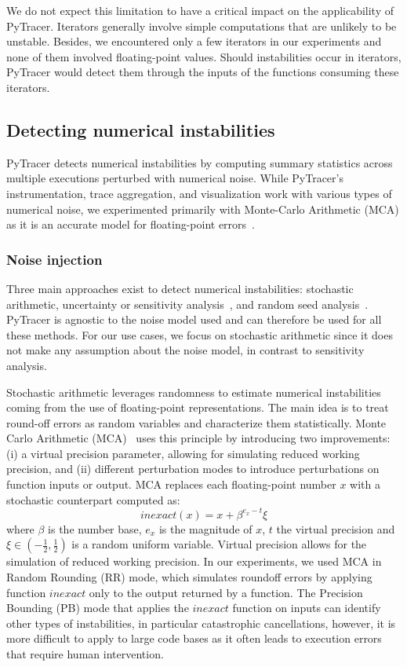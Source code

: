 \documentclass[10pt,journal,compsoc]{IEEEtran}
\newcommand{\pytracer}[0]{PyTracer\xspace}
\begin{document}
We do not expect this limitation to have a critical impact on the applicability
of \pytracer. Iterators generally involve simple computations that are unlikely
to be unstable. Besides, we encountered only a few iterators in our experiments
and none of them involved floating-point values. Should instabilities occur in
iterators, \pytracer would detect them through the inputs of the functions
consuming these iterators.

\subsection{Detecting numerical instabilities}

\pytracer detects numerical instabilities by computing summary statistics across
multiple executions perturbed with numerical noise. While \pytracer's
instrumentation, trace aggregation, and visualization work with various types of
numerical noise, we experimented primarily with Monte-Carlo Arithmetic (MCA) as
it is an accurate model for floating-point errors~\cite{verificarlo}.

\subsubsection{Noise injection}
\label{sec:fuzzy}

Three  main  approaches  exist  to  detect  numerical  instabilities: stochastic
arithmetic,  uncertainty  or  sensitivity analysis~\cite{helton2006survey}, and
random seed analysis~\cite{hellekalek1998good}. PyTracer is agnostic to the
noise model used and can therefore be used for all these methods.  For our use
cases, we focus on stochastic arithmetic since it does not make any assumption
about the noise model, in contrast to sensitivity analysis.

Stochastic arithmetic leverages randomness to estimate numerical instabilities
coming from the use of floating-point representations. The main idea is to treat
round-off errors as random variables and characterize them statistically. Monte
Carlo Arithmetic (MCA)~\cite{parker1997monte} uses this principle by introducing
two improvements: (i) a virtual precision parameter, allowing for simulating
reduced working precision, and (ii) different perturbation modes to introduce
perturbations on function inputs or output. MCA replaces each floating-point
number $x$ with a stochastic counterpart computed as:
\[
    inexact(x) =  x + \beta^{e_x - t}\xi
\]
where $\beta$ is the number base, $e_x$ is the magnitude of $x$, $t$ the virtual
precision and $\xi\! \in\! (-\frac{1}{2},\frac{1}{2})$ is a random uniform
variable. Virtual precision allows for the simulation of reduced working
precision. In our experiments, we used MCA in Random Rounding (RR) mode, which
simulates roundoff errors by applying function $inexact$ only to the output
returned by a function. The Precision Bounding (PB) mode
that applies the $inexact$ function on inputs
can identify other types of instabilities, in particular catastrophic
cancellations, however, it is more difficult to apply to large code bases as it
often leads to execution errors that require human intervention.
\end{document}
